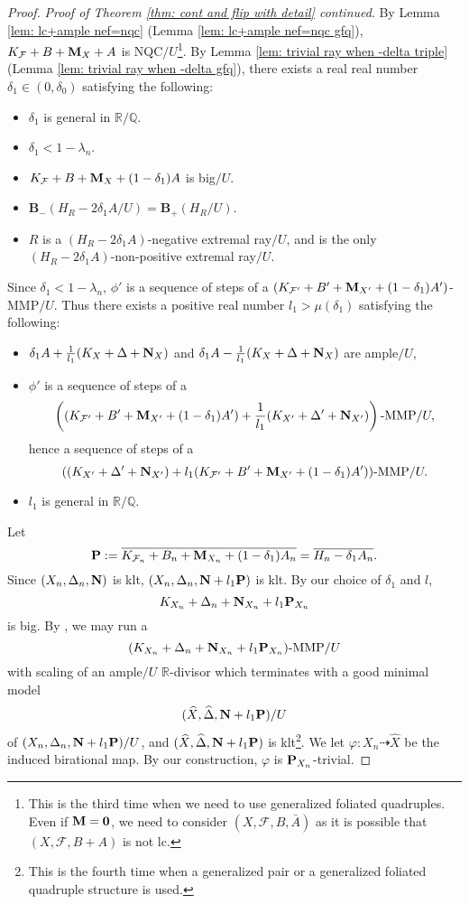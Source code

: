 \documentclass[11pt]{amsart}
\numberwithin{equation}{section}
\newcommand{\Mm}{{\bf{M}}}
\newcommand{\Nn}{{\bf{N}}}
\newcommand{\Pp}{{\bf{P}}}
\newcommand{\Rr}{\mathbb{R}}
\newcommand{\Ff}{\mathcal{F}}
\theoremstyle{definition}
\theoremstyle{definition}
\theoremstyle{definition}
\begin{document}
\begin{proof}
\noindent\textit{Proof of Theorem \ref{thm: cont and flip with detail} continued}.
By Lemma \ref{lem: lc+ample nef=nqc} (Lemma \ref{lem: lc+ample nef=nqc gfq}), $K_{\Ff}+B+\Mm_X+A$ is NQC$/U$\footnote{This is the third time when we need to use generalized foliated quadruples. Even if $\Mm=\bm{0}$, we need to consider $(X,\Ff,B,\bar A)$ as it is possible that $(X,\Ff,B+A)$ is not lc.}. By Lemma \ref{lem: trivial ray when -delta triple} (Lemma \ref{lem: trivial ray when -delta gfq}), there exists a real real number $\delta_1\in (0,\delta_0)$ satisfying the following:
\begin{itemize}
\item $\delta_1$ is general in $\mathbb R/\mathbb Q$.
\item $\delta_1<1-\lambda_n$.
    \item $K_{\Ff}+B+\Mm_X+(1-\delta_1)A$ is big$/U$. 
    \item $\textbf{B}_-(H_R-2\delta_1 A/U)=\textbf{B}_+(H_R/U)$. 
    \item $R$ is a $(H_R-2\delta_1 A)$-negative extremal ray$/U$, and is the only $(H_R-2\delta_1 A)$-non-positive extremal ray$/U$.
\end{itemize}
Since $\delta_1<1-\lambda_n$, $\phi'$ is a sequence of steps of a $(K_{\Ff'}+B'+\Mm_{X'}+(1-\delta_1)A')$-MMP$/U$. Thus there exists a positive real number $l_1>\mu(\delta_1)$ satisfying the following:
\begin{itemize}
\item $\delta_1 A+\frac{1}{l_1}(K_X+\Delta+\Nn_X)$ and $\delta_1 A-\frac{1}{l_1}(K_X+\Delta+\Nn_X)$ are ample$/U$,
\item $\phi'$ is a sequence of steps of a 
    $$\left((K_{\Ff'}+B'+\Mm_{X'}+(1-\delta_1)A')+\frac{1}{l_1}(K_{X'}+\Delta'+\Nn_{X'})\right)\text{-MMP}/U,$$
    hence a sequence of steps of a
    $$((K_{X'}+\Delta'+\Nn_{X'})+l_1(K_{\Ff'}+B'+\Mm_{X'}+(1-\delta_1)A'))\text{-MMP}/U.$$
    \item $l_1$ is general in $\mathbb R/\mathbb Q$.
\end{itemize}
Let 
$$\Pp:=\overline{K_{\Ff_n}+B_n+\Mm_{X_n}+(1-\delta_1)A_n}=\overline{H_n-\delta_1A_n}.$$ Since $(X_n,\Delta_n,\Nn)$ is klt, $(X_n,\Delta_n,\Nn+l_1\Pp)$ is klt. By our choice of $\delta_1$ and $l$,
$$K_{X_n}+\Delta_n+\Nn_{X_n}+l_1\Pp_{X_n}$$
is big. By \cite[Lemma 4.4(2)]{BZ16}, we may run a 
$$(K_{X_n}+\Delta_n+\Nn_{X_n}+l_1\Pp_{X_n})\text{-MMP}/U$$
with scaling of an ample$/U$ $\Rr$-divisor which terminates with a good minimal model 
$$(\widehat X,\widehat\Delta,\Nn+l_1\Pp)/U$$
of $(X_n,\Delta_n,\Nn+l_1\Pp)/U$, and $(\widehat X,\widehat\Delta,\Nn+l_1\Pp)$ is klt\footnote{This is the fourth time when a generalized pair or a generalized foliated quadruple structure is used.}. We let $\varphi: X_n\dashrightarrow\widehat X$ be the induced birational map. By our construction, $\varphi$ is $\Pp_{X_n}$-trivial.


\end{proof}
\end{document}
